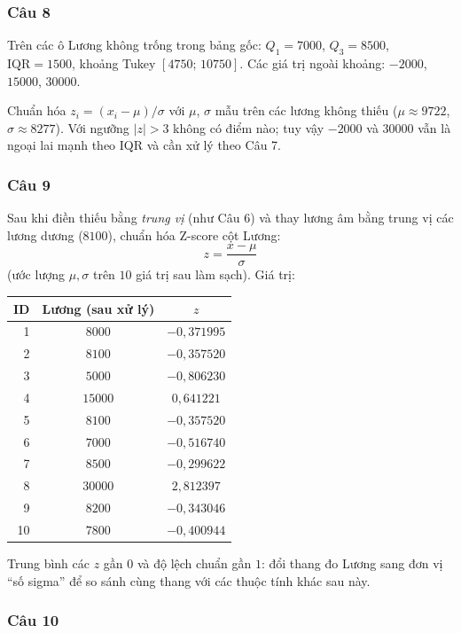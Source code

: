\subsubsection*{Câu 8}

Trên các ô Lương không trống trong bảng gốc: $Q_1=7000$, $Q_3=8500$, $\mathrm{IQR}=1500$, khoảng Tukey $[4750;\,10750]$. Các giá trị ngoài khoảng: $-2000$, $15000$, $30000$.

Chuẩn hóa $z_i=(x_i-\mu)/\sigma$ với $\mu$, $\sigma$ mẫu trên các lương không thiếu ($\mu\approx9722$, $\sigma\approx8277$). Với ngưỡng $|z|>3$ không có điểm nào; tuy vậy $-2000$ và $30000$ vẫn là ngoại lai mạnh theo IQR và cần xử lý theo Câu 7.

\subsubsection*{Câu 9}

Sau khi điền thiếu bằng \emph{trung vị} (như Câu 6) và thay lương âm bằng trung vị các lương dương ($8100$), chuẩn hóa Z-score cột Lương:
\[
z=\frac{x-\mu}{\sigma}
\]
(ước lượng $\mu,\sigma$ trên $10$ giá trị sau làm sạch). Giá trị:

\begin{center}
\small
\begin{tabular}{rcc}
ID & Lương (sau xử lý) & $z$\\\hline
1 & $8000$ & $-0{,}371995$ \\
2 & $8100$ & $-0{,}357520$ \\
3 & $5000$ & $-0{,}806230$ \\
4 & $15000$ & $0{,}641221$ \\
5 & $8100$ & $-0{,}357520$ \\
6 & $7000$ & $-0{,}516740$ \\
7 & $8500$ & $-0{,}299622$ \\
8 & $30000$ & $2{,}812397$ \\
9 & $8200$ & $-0{,}343046$ \\
10 & $7800$ & $-0{,}400944$ \\
\end{tabular}
\end{center}

Trung bình các $z$ gần $0$ và độ lệch chuẩn gần $1$: đổi thang đo Lương sang đơn vị ``số sigma'' để so sánh cùng thang với các thuộc tính khác sau này.

\subsubsection*{Câu 10}

